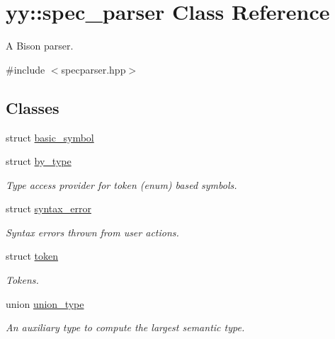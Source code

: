 \hypertarget{classyy_1_1spec__parser}{}\section{yy\+:\+:spec\+\_\+parser Class Reference}
\label{classyy_1_1spec__parser}


A Bison parser.  




{\ttfamily \#include $<$specparser.\+hpp$>$}

\subsection*{Classes}
\begin{DoxyCompactItemize}
\item 
struct \hyperlink{structyy_1_1spec__parser_1_1basic__symbol}{basic\+\_\+symbol}
\item 
struct \hyperlink{structyy_1_1spec__parser_1_1by__type}{by\+\_\+type}
\begin{DoxyCompactList}\small\item\em Type access provider for token (enum) based symbols. \end{DoxyCompactList}\item 
struct \hyperlink{structyy_1_1spec__parser_1_1syntax__error}{syntax\+\_\+error}
\begin{DoxyCompactList}\small\item\em Syntax errors thrown from user actions. \end{DoxyCompactList}\item 
struct \hyperlink{structyy_1_1spec__parser_1_1token}{token}
\begin{DoxyCompactList}\small\item\em Tokens. \end{DoxyCompactList}\item 
union \hyperlink{unionyy_1_1spec__parser_1_1union__type}{union\+\_\+type}
\begin{DoxyCompactList}\small\item\em An auxiliary type to compute the largest semantic type. \end{DoxyCompactList}\end{DoxyCompactItemize}
